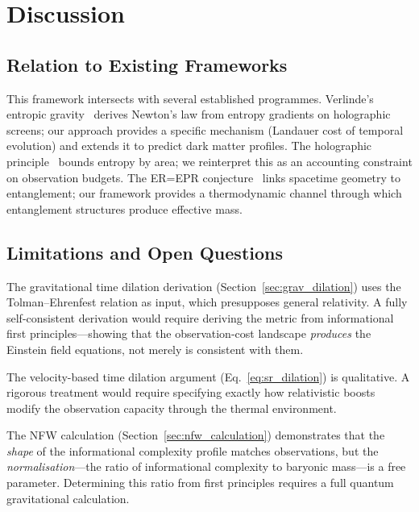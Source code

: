 \documentclass[12pt,a4paper]{article}
\begin{document}
\section{Discussion}
\label{sec:discussion}

\subsection{Relation to Existing Frameworks}

This framework intersects with several established programmes. Verlinde's entropic gravity~\cite{Verlinde2011} derives Newton's law from entropy gradients on holographic screens; our approach provides a specific mechanism (Landauer cost of temporal evolution) and extends it to predict dark matter profiles. The holographic principle~\cite{tHooft1993,Susskind1995} bounds entropy by area; we reinterpret this as an accounting constraint on observation budgets. The ER=EPR conjecture~\cite{Maldacena2013} links spacetime geometry to entanglement; our framework provides a thermodynamic channel through which entanglement structures produce effective mass.

\subsection{Limitations and Open Questions}

The gravitational time dilation derivation (Section~\ref{sec:grav_dilation}) uses the Tolman--Ehrenfest relation as input, which presupposes general relativity. A fully self-consistent derivation would require deriving the metric from informational first principles---showing that the observation-cost landscape \emph{produces} the Einstein field equations, not merely is consistent with them.

The velocity-based time dilation argument (Eq.~\ref{eq:sr_dilation}) is qualitative. A rigorous treatment would require specifying exactly how relativistic boosts modify the observation capacity through the thermal environment.

The NFW calculation (Section~\ref{sec:nfw_calculation}) demonstrates that the \emph{shape} of the informational complexity profile matches observations, but the \emph{normalisation}---the ratio of informational complexity to baryonic mass---is a free parameter. Determining this ratio from first principles requires a full quantum gravitational calculation.
\end{document}
